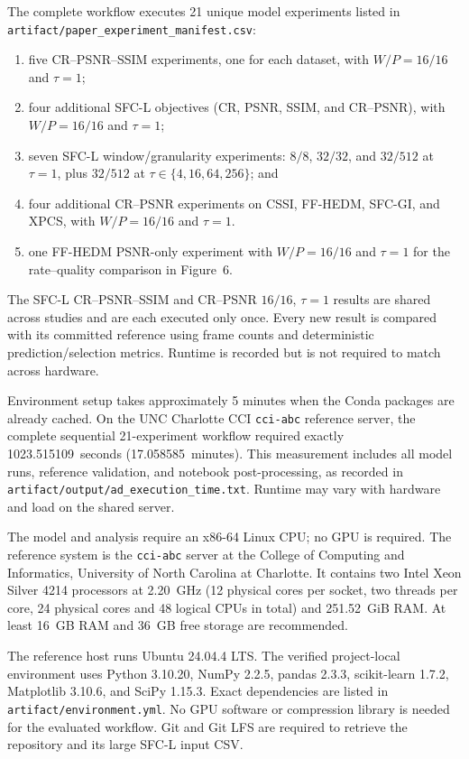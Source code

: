 \artexp
The complete workflow executes 21 unique model experiments listed in
\texttt{artifact/paper\_experiment\_manifest.csv}:
\begin{enumerate}
\item five CR--PSNR--SSIM experiments, one for each dataset, with
      $W/P=16/16$ and $\tau=1$;
\item four additional SFC-L objectives (CR, PSNR, SSIM, and CR--PSNR), with
      $W/P=16/16$ and $\tau=1$;
\item seven SFC-L window/granularity experiments: $8/8$, $32/32$, and
      $32/512$ at $\tau=1$, plus $32/512$ at
      $\tau\in\{4,16,64,256\}$; and
\item four additional CR--PSNR experiments on CSSI, FF-HEDM, SFC-GI, and
      XPCS, with $W/P=16/16$ and $\tau=1$.
\item one FF-HEDM PSNR-only experiment with $W/P=16/16$ and $\tau=1$ for
      the rate--quality comparison in Figure~6.
\end{enumerate}
The SFC-L CR--PSNR--SSIM and CR--PSNR $16/16$, $\tau=1$ results are shared
across studies and are each executed only once. Every new result is compared
with its committed reference using frame counts and deterministic
prediction/selection metrics. Runtime is recorded but is not required to match
across hardware.

\arttime
Environment setup takes approximately 5 minutes when the Conda packages are
already cached. On the UNC Charlotte CCI \texttt{cci-abc} reference server, the
complete sequential 21-experiment workflow required exactly
1023.515109~seconds (17.058585~minutes). This measurement includes all model
runs, reference validation, and notebook post-processing, as recorded in
\texttt{artifact/output/ad\_execution\_time.txt}. Runtime may vary with hardware
and load on the shared server.

\artin
{}
The model and analysis require an x86-64 Linux CPU; no GPU is required. The
reference system is the \texttt{cci-abc} server at the College of Computing and
Informatics, University of North Carolina at Charlotte. It contains two Intel
Xeon Silver 4214 processors at 2.20~GHz (12 physical cores per socket, two
threads per core, 24 physical cores and 48 logical CPUs in total) and
251.52~GiB RAM. At least 16~GB RAM and 36~GB free storage are recommended.

The reference host runs Ubuntu 24.04.4 LTS. The verified project-local
environment uses Python 3.10.20, NumPy 2.2.5, pandas 2.3.3,
scikit-learn 1.7.2, Matplotlib 3.10.6, and SciPy 1.15.3. Exact dependencies are
listed in \texttt{artifact/environment.yml}. No GPU software or compression
library is needed for the evaluated workflow. Git and Git LFS are required to
retrieve the repository and its large SFC-L input CSV.


